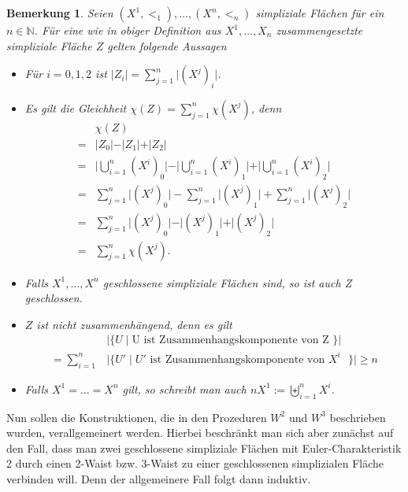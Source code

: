 \documentclass[12pt,titlepage]{article}
\newtheorem{bemerkung}{Bemerkung}[section]
\begin{document}
\begin{bemerkung}
 Seien $(X^1,<_1), \ldots,(X^n,<_n)$ simpliziale Flächen für ein $n \in \mathbb{N}$. 
 Für eine wie in obiger Definition aus $X^1,\ldots,X_n$ zusammengesetzte simpliziale Fläche $Z$ gelten folgende Aussagen
\begin{itemize}
\item Für $i=0,1,2$ ist $\vert Z_i\vert= \sum_{j=1}^n \vert (X^j)_i\vert$. 
\item  Es gilt die Gleichheit $\chi(Z)=\sum_{j=1}^n \chi(X^j)$, denn \begin{align*}
&\chi(Z)\\
=&\vert Z_0 \vert-\vert Z_1 \vert +\vert Z_2 \vert \\
=& \vert \bigcup\limits_{i=1}^{n} (X^i)_0\vert-\vert \bigcup\limits_{i=1}^{n} (X^i)_1\vert+\vert \bigcup\limits_{i=1}^{n} (X^i)_2\vert\\
=&\sum_{j=1}^n \vert (X^j)_0\vert-\sum_{j=1}^n \vert (X^j)_1\vert+\sum_{j=1}^n \vert (X^j)_2\vert\\
=&\sum_{j=1}^n \vert (X^j)_0\vert-\vert (X^j)_1\vert+\vert (X^j)_2\vert\\
=&\sum_{j=1}^n \chi(X^j).
\end{align*}
\item Falls $X^1,\ldots,X^n$ geschlossene simpliziale Flächen sind, so ist auch Z geschlossen.
\item $Z$ ist nicht zusammenhängend, denn es gilt 
\begin{align*}
&\vert \{ U \mid \text{U ist Zusammenhangskomponente von Z } \} \vert \\
=\sum_{i=1}^n &\vert \{U' \mid U' \text{ ist Zusammenhangskomponente von $X^i$ } \}\vert \geq  n
\end{align*}
\item Falls $X^1= \ldots =X^n$  gilt, so schreibt man auch $n X^1 :=\biguplus\limits_{i=1}^{n} X^i$.
\end{itemize}
\end{bemerkung}

Nun sollen die Konstruktionen, die in den Prozeduren $W^2$ und $W^3$ beschrieben wurden, verallgemeinert werden. Hierbei beschränkt man sich aber zunächst auf den Fall, dass man zwei geschlossene simpliziale Flächen mit Euler-Charakteristik 2 durch einen 2-Waist bzw. 3-Waist zu einer geschlossenen simplizialen Fläche verbinden will. Denn der allgemeinere Fall folgt dann induktiv.
\end{document}
